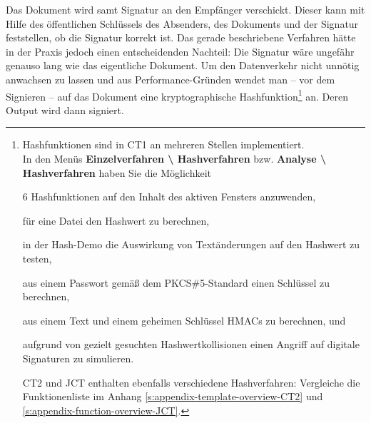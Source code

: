 \begin{refsegment}
Das Dokument wird samt Signatur an den Empfänger verschickt. Dieser kann
mit Hilfe des öffentlichen Schlüssels des Absenders, des Dokuments und
der Signatur feststellen, ob die Signatur korrekt ist.
Das gerade beschriebene Verfahren hätte in der Praxis jedoch einen
entscheidenden Nachteil: Die Signatur wäre ungefähr genauso lang wie das
eigentliche Dokument. Um den Datenverkehr nicht unnötig anwachsen zu
lassen und aus Performance-Gründen wendet man -- vor
dem Signieren -- auf das Dokument eine kryptographische
Hashfunktion\footnote{%
Hashfunktionen sind in CT1
an mehreren Stellen implementiert.\\
In den Menüs \textbf{Einzelverfahren \textbackslash{} Hashverfahren} bzw.
              \textbf{Analyse \textbackslash{} Hashverfahren}
haben Sie die Möglichkeit
\begin{list}{\textbullet}{\addtolength{\itemsep}{-1.0\baselineskip}}
\item 6 Hashfunktionen auf den Inhalt des aktiven Fensters anzuwenden,\\
\item für eine Datei den Hashwert zu berechnen,\\
\item in der Hash-Demo die Auswirkung von Textänderungen auf den
      Hashwert zu testen,\\
\item aus einem Passwort gemäß dem PKCS\#5-Standard
      einen Schlüssel zu berechnen,\\
\item aus einem Text und einem geheimen Schlüssel HMACs zu berechnen, und\\
\item aufgrund von gezielt gesuchten Hashwertkollisionen
      einen Angriff auf digitale Signaturen zu simulieren.
\end{list}
CT2 und JCT enthalten ebenfalls verschiedene
Hashverfahren: Vergleiche die Funktionenliste im Anhang
\ref{s:appendix-template-overview-CT2} und
\ref{s:appendix-function-overview-JCT}.
} an. Deren Output wird dann signiert.



\hypertarget{Hash-functions-ht}{}

\end{refsegment}
